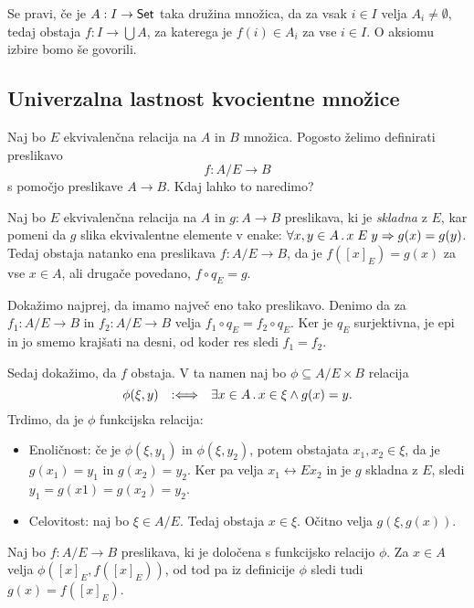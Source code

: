 Se pravi, če je $A : I \to \mathsf{Set}$ taka družina množica, da za vsak $i \in I$ velja $A_i \neq \emptyset$,
tedaj obstaja $f : I \to \bigcup A$, za katerega je $f(i) \in A_i$ za vse $i \in I$.
%
O aksiomu izbire bomo še govorili.


\subsection{Univerzalna lastnost kvocientne množice}

Naj bo $E$ ekvivalenčna relacija na $A$ in $B$ množica. Pogosto želimo definirati
preslikavo
%
\begin{equation*}
    f : A/E \to B
\end{equation*}
%
s pomočjo preslikave $A \to B$. Kdaj lahko to naredimo?

\begin{izrek}
  Naj bo $E$ ekvivalenčna relacija na $A$ in $g : A \to B$ preslikava, ki je \emph{skladna} z $E$, kar pomeni da $g$
  slika ekvivalentne elemente v enake: $\forall x, y \in A \,.\, x \mathrel{E} y \Rightarrow g(x) = g(y)$. Tedaj obstaja natanko ena
  preslikava $f : A/E \to B$, da je $f([x]_E) = g(x)$ za vse $x \in A$, ali drugače povedano, $f \circ q_E = g$.
\end{izrek}

\begin{dokaz}
  Dokažimo najprej, da imamo največ eno tako preslikavo. Denimo da za $f_1 : A/E \to B$ in
  $f_2 : A/E \to B$ velja $f_1 \circ q_E = f_2 \circ q_E$. Ker je $q_E$ surjektivna, je epi in jo smemo
  krajšati na desni, od koder res sledi $f_1 = f_2$.

  Sedaj dokažimo, da $f$ obstaja. V ta namen naj bo $\phi \subseteq A/E \times B$ relacija
  \begin{equation*}
    \phi(\xi, y) \quad {{:}{\Longleftrightarrow}}\quad \exists x \in A \,.\, x \in \xi \land g(x) = y.
  \end{equation*}
  Trdimo, da je $\phi$ funkcijska relacija:
  \begin{itemize}
  \item
    Enoličnost: če je $\phi(\xi, y_1)$ in $\phi(\xi, y_2)$, potem obstajata $x_1, x_2 \in \xi$, da je $g(x_1) = y_1$
    in $g(x_2) = y_2$. Ker pa velja $x_1 \rel{E} x_2$ in je $g$ skladna z $E$, sledi $y_1 = g(x1) = g(x_2) = y_2$.

  \item  Celovitost: naj bo $\xi \in A/E$. Tedaj obstaja $x \in \xi$. Očitno velja $g(\xi, g(x))$.
  \end{itemize}
  Naj bo $f : A/E \to B$ preslikava, ki je določena s funkcijsko relacijo $\phi$. Za $x \in A$
  velja $\phi([x]_E, f([x]_E))$, od tod pa iz definicije $\phi$ sledi tudi $g(x) = f([x]_E)$.
\end{dokaz}

